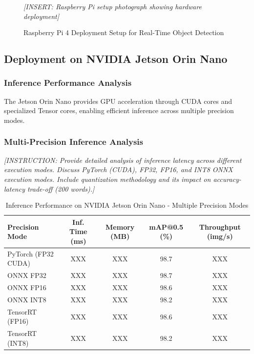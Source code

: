 \documentclass[11pt,a4paper]{article}
\begin{document}
\begin{figure}[H]
    \centering
    \textit{[INSERT: Raspberry Pi setup photograph showing hardware deployment]}
    \caption{Raspberry Pi 4 Deployment Setup for Real-Time Object Detection}
    \label{fig:rpi_setup}
\end{figure}

\subsection{Deployment on NVIDIA Jetson Orin Nano}

\subsubsection{Inference Performance Analysis}

The Jetson Orin Nano provides GPU acceleration through CUDA cores and specialized Tensor cores, 
enabling efficient inference across multiple precision modes.

\subsubsection{Multi-Precision Inference Analysis}

\textit{[INSTRUCTION: Provide detailed analysis of inference latency across different execution modes. 
Discuss PyTorch (CUDA), FP32, FP16, and INT8 ONNX execution modes. Include quantization methodology 
and its impact on accuracy-latency trade-off (200 words).]}

\begin{table}[H]
    \centering
    \caption{Inference Performance on NVIDIA Jetson Orin Nano - Multiple Precision Modes}
    \label{tab:jetson_inference}
    \begin{tabular}{|l|c|c|c|c|}
    \hline
    \textbf{Precision Mode} & \textbf{Inf. Time (ms)} & \textbf{Memory (MB)} & 
    \textbf{mAP@0.5 (\%)} & \textbf{Throughput (img/s)} \\
    \hline
    PyTorch (FP32 CUDA) & XXX & XXX & 98.7 & XXX \\
    ONNX FP32 & XXX & XXX & 98.7 & XXX \\
    ONNX FP16 & XXX & XXX & 98.6 & XXX \\
    ONNX INT8 & XXX & XXX & 98.2 & XXX \\
    TensorRT (FP16) & XXX & XXX & 98.6 & XXX \\
    TensorRT (INT8) & XXX & XXX & 98.2 & XXX \\
    \hline
    \end{tabular}
\end{table}
\end{document}
